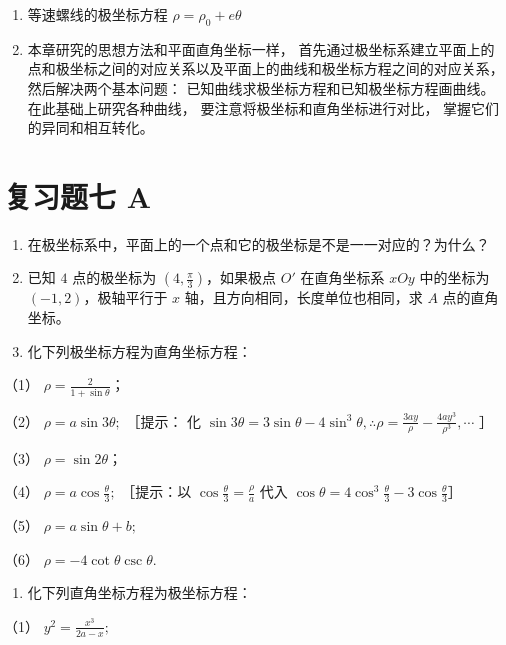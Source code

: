 \begin{enumerate}
\def\labelenumi{\arabic{enumi}.}
\setcounter{enumi}{5}
\item
  等速螺线的极坐标方程 \(\rho=\rho_{0}+e\theta\)
\item
  本章研究的思想方法和平面直角坐标一样，
  首先通过极坐标系建立平面上的点和极坐标之间的对应关系以及平面上的曲线和极坐标方程之间的对应关系，
  然后解决两个基本问题： 已知曲线求极坐标方程和已知极坐标方程画曲线。
  在此基础上研究各种曲线， 要注意将极坐标和直角坐标进行对比，
  掌握它们的异同和相互转化。
\end{enumerate}

\section{复习题七 A}\label{ux590dux4e60ux9898ux4e03-a}

\begin{enumerate}
\def\labelenumi{\arabic{enumi}.}
\item
  在极坐标系中，平面上的一个点和它的极坐标是不是一一对应的？为什么？
\item
  已知 \(4\) 点的极坐标为 \(\left(4, \frac{\pi}{3}\right)\)，如果极点
  \(O'\) 在直角坐标系 \(xOy\) 中的坐标为 \((-1, 2)\)，极轴平行于 \(x\)
  轴，且方向相同，长度单位也相同，求 \(A\) 点的直角坐标。
\item
  化下列极坐标方程为直角坐标方程：
\end{enumerate}

（1） \(\rho = \frac{2}{1 + \sin\theta}\)；

（2） \(\rho = a\sin 3\theta ;\) ［提示： 化
\(\sin3\theta=3\sin\theta-4\sin^{3}\theta,\therefore\rho=\frac{3ay}{\rho}-\frac{4ay^{3}}{\rho^{3}},\cdots\)
］

（3） \(\rho = \sin 2\theta\)；

（4） \(\rho = a\cos \frac{\theta}{3};\) ［提示：以
\(\cos \frac{\theta}{3} = \frac{\rho}{a}\) 代入
\(\cos \theta = 4\cos^3\frac{\theta}{3} - 3\cos \frac{\theta}{3}\)］

（5） \(\rho=a\sin\theta+b;\)

（6） \(\rho = -4\cot \theta \csc \theta.\)

\begin{enumerate}
\def\labelenumi{\arabic{enumi}.}
\setcounter{enumi}{3}
\tightlist
\item
  化下列直角坐标方程为极坐标方程：
\end{enumerate}

（1） \(y^{2} = \frac{x^{3}}{2a - x};\)

